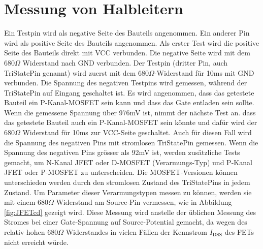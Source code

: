 \section{Messung von Halbleitern}
Ein Testpin wird als negative Seite des Bauteils angenommen.
Ein anderer Pin wird als positive Seite des Bauteils angenommen.
Als erster Test wird die positive Seite des Bauteils direkt mit VCC verbunden.
Die negative Seite wird mit dem \(680\Omega\) Widerstand nach GND verbunden.
Der Testpin (dritter Pin, auch TriStatePin genannt) wird zuerst mit dem \(680\Omega\)-Widerstand
für 10ms mit GND verbunden.
Die Spannung des negativen Testpins wird gemessen, während der TriStatePin auf Eingang
geschaltet ist.
Es wird angenommen, dass das getestete Bauteil ein P-Kanal-MOSFET sein kann und dass das Gate
entladen sein sollte.
Wenn die gemessene Spannung über 976mV ist, nimmt der nächste Test an. dass das getestete
Bauteil auch ein P-Kanal-MOSFET sein könnte und dafür wird der \(680\Omega\) Widerstand
für 10ms zur VCC-Seite geschaltet.
Auch für diesen Fall wird die Spannung des negativen Pins mit stromlosen TriStatePin gemessen.
Wenn die Spannung des negativen Pins grösser als 92mV ist, werden zusätzliche Tests gemacht, 
um N-Kanal JFET oder D-MOSFET (Verarmungs-Typ) und P-Kanal JFET oder P-MOSFET zu unterscheiden.
Die MOSFET-Versionen können unterschieden werden durch den stromlosen Zustand des
TriStatePins in jedem Zustand.
Um Parameter dieser Verarmungstypen messen zu können, werden sie mit einem \(680 \Omega\)-Widerstand am
Source-Pin vermessen, wie in Abbildung \ref{fig:JFETcd} gezeigt wird. Diese Messung wird anstelle der
üblichen Messung des Stromes bei einer Gate-Spannung auf Source-Potential gemacht, da wegen des
relativ hohen \(680 \Omega\) Widerstandes in vielen Fällen der Kennstrom \(I_\mathrm{DSS}\) 
des FETs nicht erreicht würde.

